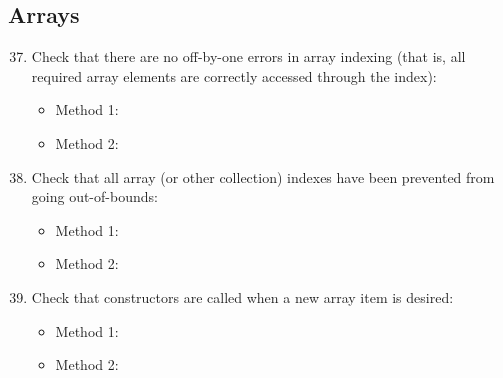 \subsection{Arrays}
\begin{enumerate}
	\setcounter{enumi}{36}
	\item Check that there are no off-by-one errors in array indexing (that is, all required array elements are correctly accessed through the index):
	\begin{itemize}
		\item Method 1: \cmark
		\item Method 2:
	\end{itemize}
	\item Check that all array (or other collection) indexes have been prevented from going out-of-bounds:
	\begin{itemize}
		\item Method 1: \cmark
		\item Method 2:
	\end{itemize}
	\item Check that constructors are called when a new array item is desired:
	\begin{itemize}
		\item Method 1: \cmark
		\item Method 2: 
	\end{itemize}
\end{enumerate}